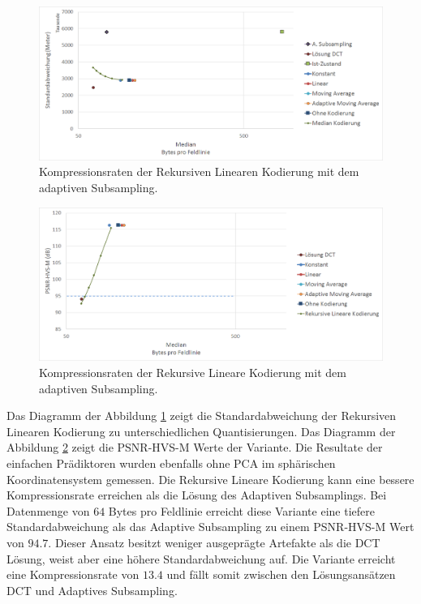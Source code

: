 \begin{figure}[!htbp]
	\center
	\includegraphics[width=1\textwidth,keepaspectratio]{./pictures/resultate/loesung2/variante2/resultate.png}
	
	\caption{Kompressionsraten der Rekursiven Linearen Kodierung mit dem adaptiven Subsampling.}
	\label{resultate:loesung2:adaptive:median}
\end{figure}
\begin{figure}[!htbp]
	\includegraphics[width=1\textwidth,keepaspectratio]{./pictures/resultate/loesung2/variante2/resultate_psnr.png}
	
	\caption{Kompressionsraten der Rekursive Lineare Kodierung mit dem adaptiven Subsampling.}
	\label{resultate:loesung2:adaptive:median_psnr}
\end{figure}
Das Diagramm der Abbildung \ref{resultate:loesung2:adaptive:median} zeigt die Standardabweichung der Rekursiven Linearen Kodierung zu unterschiedlichen Quantisierungen. Das Diagramm der Abbildung \ref{resultate:loesung2:adaptive:median_psnr} zeigt die PSNR-HVS-M Werte der Variante. Die Resultate der einfachen Prädiktoren wurden ebenfalls ohne PCA im sphärischen Koordinatensystem gemessen. Die Rekursive Lineare Kodierung kann eine bessere Kompressionsrate erreichen als die Lösung des Adaptiven Subsamplings. Bei Datenmenge von $64$ Bytes pro Feldlinie erreicht diese Variante eine tiefere Standardabweichung als das Adaptive Subsampling zu einem PSNR-HVS-M Wert von $94.7$. Dieser Ansatz besitzt weniger ausgeprägte Artefakte als die DCT Lösung, weist aber eine höhere Standardabweichung auf. Die Variante erreicht eine Kompressionsrate von $13.4$ und fällt somit zwischen den Lösungsansätzen DCT und Adaptives Subsampling.

